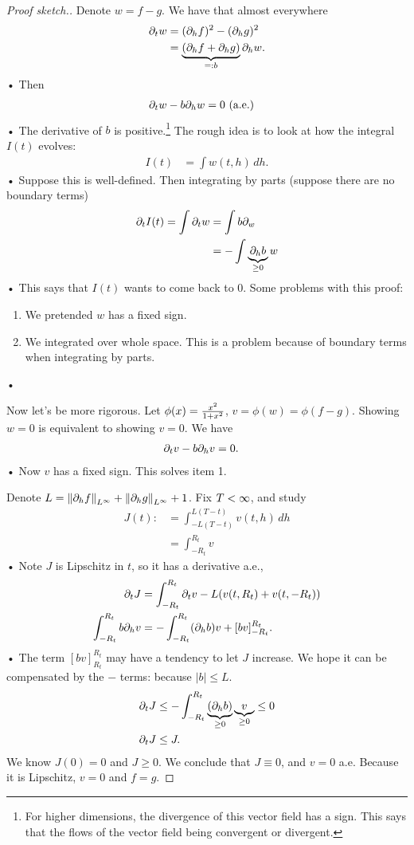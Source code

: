 \begin{proof}[Proof sketch.]
Denote $w=f-g$. We have that almost everywhere
\begin{align*}
\partial_t w&= (\partial_hf)^2 - (\partial_hg)^2\\
&= \underbrace{(\partial_h f+\partial_hg)}_{=:b} \partial_h w.
\end{align*}•
Then 
\begin{align*}
\partial_t w - b\partial_h w&=0\text{ (a.e.)}
\end{align*}•
The derivative of $b$ is positive.\footnote{For higher dimensions, the divergence of this vector field has a sign. This says that the flows of the vector field being convergent or divergent.}
The rough idea is to look at how the integral $I(t)$ evolves:
\begin{align*}
I(t) &= \int w(t,h)\,dh.
\end{align*}•
Suppose this is well-defined. Then integrating by parts (suppose there are no boundary terms)
\begin{align*}
\partial_t I(t) = \int\partial_t w &= \int b \partial_w\\
&=-\int \underbrace{\partial_h b}_{\ge0} w
\end{align*}•
This says that $I(t)$ wants to come back to 0.
Some problems with this proof:
\begin{enumerate}
\item
We pretended $w$ has a fixed sign.
\item We integrated over whole space. This is a problem because of boundary terms when integrating by parts.
\end{enumerate}•

Now let's be more rigorous. Let $\phi(x) = \frac{x^2}{1+x^2}$, $v=\phi(w)=\phi(f-g)$. Showing $w=0$ is equivalent to showing $v=0$. We have %
\begin{align*}
\partial_t v - b\partial_h v&=0.
\end{align*}•
Now $v$ has a fixed sign. This solves item 1.

Denote $L=\left\Vert {\partial_h f}\right\Vert_{L^\infty}+\left\Vert {\partial_h g}\right\Vert_{L^\infty} + 1$. 
Fix $T<\infty$, and study
\begin{align*}
J(t) :&= \int_{-L(T-t)}^{L(T-t)} v(t,h)\,dh\\
&= \int_{-R_t}^{R_t} v
\end{align*}•
Note $J$ is Lipschitz in $t$, so it has a derivative a.e.,
\begin{align*}
\partial_t J &=\int_{-R_t}^{R_t} \partial_t v - L(v(t,R_t)+v(t,-R_t))\\
\int_{-R_t}^{R_t} b \partial_h v
&=-\int_{-R_t}^{R_t} (\partial_h b)v + [bv]_{-R_t}^{R_t}.
\end{align*}•
The term $[bv]^{R_t}_{R_t}$ may have a tendency to let $J$ increase. We hope it can be compensated by the $-$ terms: because $|b|\le L$.
\begin{align*}
\partial_t J &\le -\int_{-R_t}^{R_t} \underbrace{(\partial_h b)}_{\ge 0}\underbrace{v}_{\ge 0}\le 0\\
\partial_t J&\le J.
\end{align*}
We know $J(0)=0$ and $J\ge 0$. We conclude that $J\equiv 0$, and $v=0$ a.e. Because it is Lipschitz, $v=0$ and $f=g$.
\end{proof}
